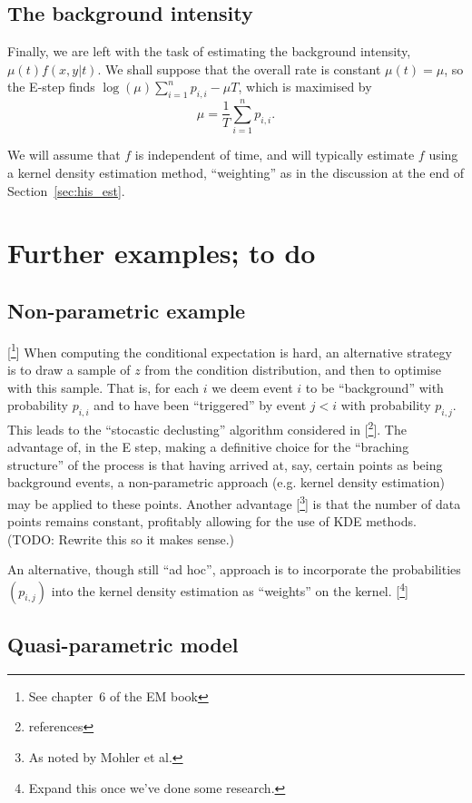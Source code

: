 \documentclass[twoside,a4paper]{article}
\theoremstyle{plain}
\theoremstyle{definition}
\begin{document}
\subsection{The background intensity}

Finally, we are left with the task of estimating the background intensity,
$\mu(t) f(x,y|t)$.  We shall suppose that the overall rate is constant $\mu(t)=\mu$,
so the E-step finds $\log(\mu) \sum_{i=1}^n p_{i,i} - \mu T$,
which is maximised by
\[ \mu = \frac{1}{T} \sum_{i=1}^n p_{i,i}. \]

We will assume that $f$ is independent of time, and will typically estimate $f$
using a kernel density estimation method, ``weighting'' as in the discussion
at the end of Section~\ref{sec:his_est}.




\section{Further examples; to do}

\subsection{Non-parametric example}

[\footnote{See chapter~6 of the EM book}]
When computing the conditional expectation is hard, an alternative strategy is to draw a sample
of $z$ from the condition distribution, and then to optimise with this sample.  That is, for
each $i$ we deem event $i$ to be ``background'' with probability $p_{i,i}$ and to have been
``triggered'' by event $j<i$ with probability $p_{i,j}$.  This leads to the ``stocastic declusting''
algorithm considered in [\footnote{references}].  The advantage of, in the E step, making
a definitive choice for the ``braching structure'' of the process is that having arrived at,
say, certain points as being background events, a non-parametric approach (e.g. kernel density
estimation) may be applied to these points.  Another advantage [\footnote{As noted by Mohler et al.}]
is that the number of data points remains constant, profitably allowing for the use of KDE methods.
(TODO: Rewrite this so it makes sense.)

An alternative, though still ``ad hoc'', approach is to incorporate the probabilities $(p_{i,j})$
into the kernel density estimation as ``weights'' on the kernel.  [\footnote{Expand this once we've
done some research.}]


\subsection{Quasi-parametric model}
\end{document}
